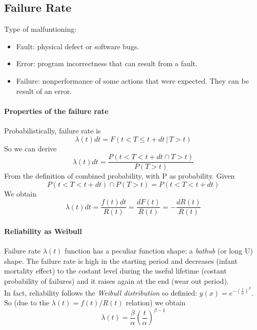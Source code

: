 \documentclass[10pt,a4paper]{article}
\begin{document}
			\subsection{Failure Rate}
				Type of malfuntioning:
				\begin{itemize}
					\item Fault: physical defect or software bugs.
					\item Error: program incorrectness that can result from a fault.
					\item Failure: nonperformance of some actions that were expected. They can be result of an error.
				\end{itemize}
				
				\paragraph{Properties of the failure rate}
					Probabilistically, failure rate is
					\begin{equation}
						\lambda(t)dt = F(t < T \leq t+dt \,\vert\, T > t)
					\end{equation}
					So we can derive
					\begin{equation}
						\lambda(t)dt = \frac{P(t < T < t + dt \cap T > t)}{P(T > t)}
					\end{equation}
					From the definition of combined probability, with P as probability. Given
					\begin{equation}
						P(t < T < t+dt) \cap P(T > t) = P(t < T < t+dt)
					\end{equation}
					We obtain
					\begin{equation}
						\lambda(t)dt = \frac{f(t)dt}{R(t)} = \frac{dF(t)}{R(t)} = -\frac{dR(t)}{R(t)}
					\end{equation}
				
				\paragraph{Reliability as Weibull}
					Failure rate $\lambda(t)$ function has a peculiar function shape: a \emph{bathub} (or long U) shape. The failure rate is high in the starting period and decreases (infant mortality effect) to the costant level during the useful lifetime (costant probability of failures) and it raises again at the end (wear out period).\\
					
					In fact, reliability follows the \emph{Weibull distribution} so definied: $y(x) = e^{-(\frac{x}{\alpha})^{\beta}}$. So (due to the $\lambda(t) = f(t) / R(t)$ relation) we obtain
					\begin{equation}
						\lambda(t) = \frac{\beta}{\alpha}(\frac{t}{\alpha})^{\beta - 1}
					\end{equation}
					
\end{document}
